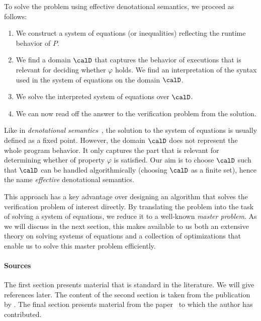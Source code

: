 \documentclass[../../diss.tex]{subfiles}
\begin{document}
%
\cheatpagebreak
%

To solve the problem using effective denotational semantics, we proceed as follows:

\begin{enumerate}[(1)]
    \item We construct a system of equations (or inequalities) reflecting the runtime behavior of $P$.
    \item We find a domain $\domain$ that captures the behavior of executions that is relevant for deciding whether $\varphi$ holds.
        We find an interpretation of the syntax used in the system of equations on the domain $\domain$.
    \item We solve the interpreted system of equations over $\domain$.
    \item We can now read off the answer to the verification problem from the solution.
\end{enumerate}

Like in \emph{denotational semantics}~\cite{ScottS71}, the solution to the system of equations is usually defined as a fixed point.
However, the domain $\domain$ does not represent the whole program behavior.
It only captures the part that is relevant for determining whether of property $\varphi$ is satisfied.
Our aim is to choose $\domain$ such that $\domain$ can be handled algorithmically (\eg choosing $\domain$ as a finite set), hence the name \emph{effective} denotational semantics.

This approach has a key advantage over designing an algorithm that solves the verification problem of interest directly.
By translating the problem into the task of solving a system of equations, we reduce it to a well-known \emph{master problem}.
As we will discuss in the next section, this makes available to us both an extensive theory on solving systems of equations and a collection of optimizations that enable us to solve this master problem efficiently.

\paragraph{Sources}

The first section presents material that is standard in the literature.
We will give references later.
The content of the second section is taken from the publication~\cite{HolikM15} by \citeauthor{HolikM15}.
The final section presents material from the paper~\cite{MeyerMN17a} to which the author has contributed.
\end{document}
